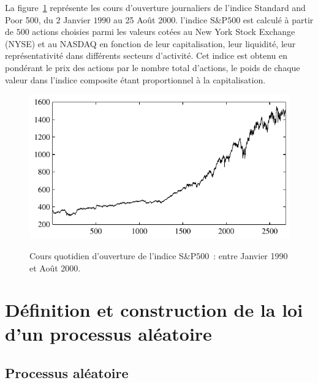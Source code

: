 \begin{example}
La figure~\ref{fig:SP} repr\'esente les cours d'ouverture
journaliers de l'indice Standard and Poor 500, du $2$ Janvier
$1990$ au 25 Ao\^ut 2000. l'indice S\&P$500$ est calcul\'e \`a
partir de $500$ actions choisies parmi les valeurs cot\'ees au New
York Stock Exchange (NYSE) et au NASDAQ en fonction de leur
capitalisation, leur liquidit\'e, leur repr\'esentativit\'e dans
diff\'erents secteurs d'activit\'e. Cet indice est obtenu en pond\'erant
le prix des actions par le nombre total d'actions, le poids de
chaque valeur dans l'indice composite \'etant proportionnel \`a la
capitalisation.
\begin{figure}
  \centering
  \includegraphics[width=\textwidth]{Figures/SP}\\
  \caption{Cours quotidien d'ouverture de l'indice S\&P$500$~:
 entre Janvier 1990 et Ao\^ut 2000.}\label{fig:SP}
\end{figure}
\end{example}


\section{D\'efinition et construction de la loi d'un processus al\'eatoire}
\label{sec:gene}
\subsection{Processus al\'eatoire}

